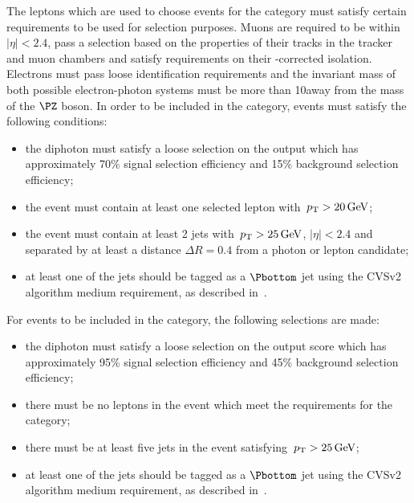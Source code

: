 The leptons which are used to choose events for the \TTHLeptonicTag category must satisfy certain requirements to be used for selection purposes. Muons are required to be within $|\eta|<2.4$, pass a selection based on the properties of their tracks in the tracker and muon chambers and satisfy requirements on their \PU-corrected isolation. Electrons must pass loose identification requirements and the invariant mass of both possible electron-photon systems must be more than 10\GeV away from the mass of the $\PZ$ boson. In order to be included in the \TTHLeptonicTag category, events must satisfy the following conditions:
\begin{itemize}
\item the diphoton must satisfy a loose selection on the \DiPhoBdt output which has approximately 70\% signal selection efficiency and 15\% background selection efficiency; 
\item the event must contain at least one selected lepton with $\,p_\text{T}>20\,\text{Ge\hspace{-.08em}V}$; %
\item the event must contain at least 2 jets with $\,p_\text{T}>25\,\text{Ge\hspace{-.08em}V}$, $|\eta|<2.4$ and separated by at least a distance $\Delta R=0.4$ from a photon or lepton candidate;
\item at least one of the jets should be tagged as a $\Pbottom$ jet using the CVSv2 algorithm medium requirement, as described in~\cite{bjets}.
\end{itemize}

For events to be included in the \TTHHadronicTag category, the following selections are made:
\begin{itemize}
\item the diphoton must satisfy a loose selection on the \DiPhoBdt output score which has approximately 95\% signal selection efficiency and 45\% background selection efficiency; 
\item there must be no leptons in the event which meet the requirements for the \TTHLeptonicTag category;
\item there must be at least five jets in the event satisfying $\,p_\text{T} >25\,\text{Ge\hspace{-.08em}V}$;
\item at least one of the jets should be tagged as a $\Pbottom$ jet using the CVSv2 algorithm medium requirement, as described in~\cite{bjets}.
\end{itemize}

